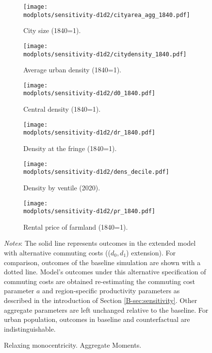 \documentclass[11pt]{report}
\newcommand{\round}{revision3}  %
\newcommand{\modplots}{../../output/model/plots/\round}
\newcommand{\pthree}{0.37}  %
\newcommand{\parboxadjust}{1.1}
\begin{document}
\begin{figure}
	\begin{adjustbox}{center}
		\parbox{\parboxadjust\textwidth}{\lineskip=0pt
			
			\begin{subfigure}{\pthree\textwidth}
				\texttt{[image: \\modplots/sensitivity-d1d2/cityarea\_agg\_1840.pdf]}
				\caption{City size (1840=1).\label{B-fig:model-sensi-d1d2-areaagg}}
			\end{subfigure}%
			\begin{subfigure}{\pthree\textwidth}
				\texttt{[image: \\modplots/sensitivity-d1d2/citydensity\_1840.pdf]}
				\caption{Average urban density (1840=1).\label{B-fig:model-sensi-d1d2-avgd}}
			\end{subfigure}%
			\begin{subfigure}{\pthree\textwidth}
				\texttt{[image: \\modplots/sensitivity-d1d2/d0\_1840.pdf]}
				\caption{Central density (1840=1).\label{B-fig:model-sensi-d1d2-d0}}
			\end{subfigure}
			
			\begin{subfigure}{\pthree\textwidth}
				\texttt{[image: \\modplots/sensitivity-d1d2/dr\_1840.pdf]}
				\caption{Density at the fringe (1840=1).\label{B-fig:model-sensi-d1d2-dr}}
			\end{subfigure}%
			\begin{subfigure}{\pthree\textwidth}
				\texttt{[image: \\modplots/sensitivity-d1d2/dens\_decile.pdf]}
				\caption{Density by ventile (2020).\label{B-fig:model-sensi-d1d2-decile}}
			\end{subfigure}%
			\begin{subfigure}{\pthree\textwidth}
				\texttt{[image: \\modplots/sensitivity-d1d2/ρr\_1840.pdf]}
				\caption{Rental price of farmland (1840=1).\label{B-fig:model-sensi-d1d2-rho}}
			\end{subfigure}
		}
	\end{adjustbox}
	\caption{Relaxing monocentricity. Aggregate Moments.\label{B-fig:model-sensi-d1d2}}
	{\footnotesize \textit{Notes}: The solid line represents outcomes in the extended model with alternative commuting costs (($d_0,d_1$) extension). For comparison, outcomes of the baseline simulation are shown with a dotted line. Model's outcomes under this alternative specification of commuting costs are obtained re-estimating the commuting cost parameter $a$ and region-specific productivity parameters as described in the introduction of Section \ref{B-sec:sensitivity}. Other aggregate parameters are left unchanged relative to the baseline. For urban population, outcomes in baseline and counterfactual are indistinguishable.}
\end{figure}
\end{document}
